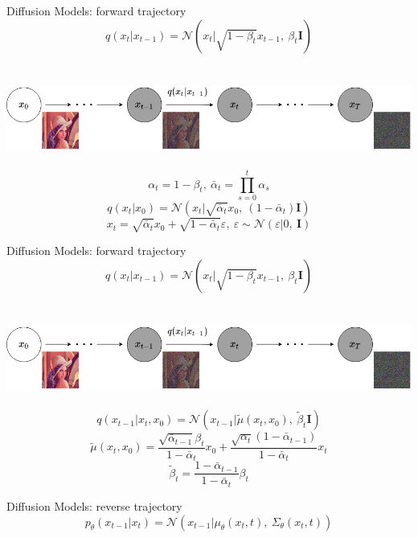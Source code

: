 \documentclass{beamer}
\begin{document}
\begin{frame}[t]{Diffusion Models: forward trajectory \cite{sohldickstein2015deep}}
    $$ q(x_t | x_{t-1}) = \mathcal{N}(x_t|\sqrt{1 - \beta_t} x_{t-1},\ \beta_t \mathbf{I}) $$ \\~\\
    \includegraphics[width=\textwidth]{../images/2022-03-17-diffusion_models_files/noising.png} \\~\\
    $$ \alpha_t = 1 - \beta_t,~\bar{\alpha}_t = \prod\limits_{s=0}^t \alpha_s $$
    $$ q(x_t|x_0) = \mathcal{N}(x_t|\sqrt{\bar{\alpha}_t} x_0,\ (1 - \bar{\alpha}_t) \mathbf{I}) $$
    $$ x_t = \sqrt{\bar{\alpha}_t} x_0 + \sqrt{1 - \bar{\alpha}_t} \varepsilon,\ \varepsilon \sim \mathcal{N}(\varepsilon | 0,\ \mathbf{I}) $$
\end{frame}

\begin{frame}[t]{Diffusion Models: forward trajectory \cite{sohldickstein2015deep}}
    $$ q(x_t | x_{t-1}) = \mathcal{N}(x_t|\sqrt{1 - \beta_t} x_{t-1},\ \beta_t \mathbf{I}) $$ \\~\\
    \includegraphics[width=\textwidth]{../images/2022-03-17-diffusion_models_files/noising.png} \\~\\
    $$ q(x_{t-1}|x_t, x_0) = \mathcal{N}(x_{t-1} | \tilde{\mu}(x_t, x_0),\ \tilde{\beta}_t \mathbf{I}) $$
    $$ \tilde{\mu}(x_t, x_0) = \frac{\sqrt{\bar{\alpha}_{t-1}} \beta_t}{1 - \bar{\alpha}_t} x_0 + \frac{\sqrt{\alpha_t} (1 - \bar{\alpha}_{t-1})}{1 - \bar{\alpha}_t} x_t $$
    $$ \tilde{\beta}_t = \frac{1 - \bar{\alpha}_{t-1}}{1 - \bar{\alpha}_t} \beta_t $$
\end{frame}

\begin{frame}[t]{Diffusion Models: reverse trajectory \cite{sohldickstein2015deep}}
    $$ p_\theta(x_{t-1}|x_t) = \mathcal{N}(x_{t-1} | \mu_\theta(x_t, t),\ \Sigma_\theta(x_t, t)) $$
\end{frame}
\end{document}

